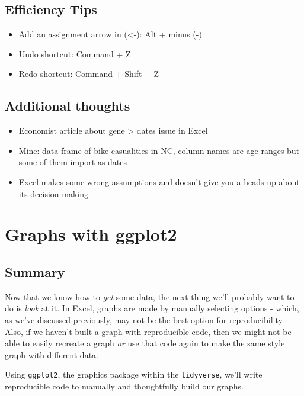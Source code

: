 \documentclass[]{book}
\providecommand{\tightlist}{%
  \setlength{\itemsep}{0pt}\setlength{\parskip}{0pt}}
\begin{document}
\hypertarget{efficiency-tips-2}{%
\section{Efficiency Tips}\label{efficiency-tips-2}}

\begin{itemize}
\tightlist
\item
  Add an assignment arrow in (\textless{}-): Alt + minus (-)
\item
  Undo shortcut: Command + Z
\item
  Redo shortcut: Command + Shift + Z
\end{itemize}

\hypertarget{additional-thoughts}{%
\section{Additional thoughts}\label{additional-thoughts}}

\begin{itemize}
\tightlist
\item
  Economist article about gene \textgreater{} dates issue in Excel
\item
  Mine: data frame of bike casualities in NC, column names are age ranges but some of them import as dates
\item
  Excel makes some wrong assumptions and doesn't give you a heads up about its decision making
\end{itemize}

\hypertarget{ggplot2}{%
\chapter{Graphs with ggplot2}\label{ggplot2}}

\hypertarget{summary-3}{%
\section{Summary}\label{summary-3}}

Now that we know how to \emph{get} some data, the next thing we'll probably want to do is \emph{look} at it. In Excel, graphs are made by manually selecting options - which, as we've discussed previously, may not be the best option for reproducibility. Also, if we haven't built a graph with reproducible code, then we might not be able to easily recreate a graph \emph{or} use that code again to make the same style graph with different data.

Using \texttt{ggplot2}, the graphics package within the \texttt{tidyverse}, we'll write reproducible code to manually and thoughtfully build our graphs.
\end{document}
